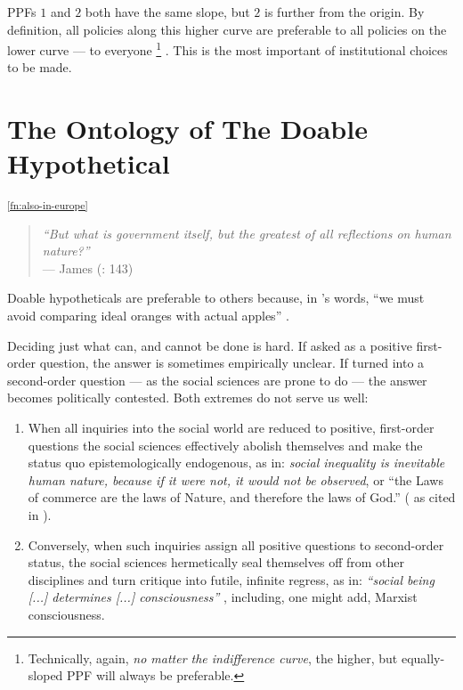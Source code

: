 	\glspl{PPF} $1$ and $2$ both have the same slope, but $2$ is further from the origin.
	By definition, all policies along this higher curve are preferable to all policies on the lower curve --- to everyone
	\footnote{
		Technically, again, \emph{no matter the indifference curve}, the higher, but equally-sloped \gls{PPF} will always be preferable. 
	}
	.
	This is the most important of institutional choices to be made.
	



\section[Ontology]{The Ontology of The Doable Hypothetical} \label{sec:doable} 

\textsuperscript{\ref{fn:also-in-europe}}


\begin{quote}
	\emph{``But what is government itself, but the greatest of all reflections on human nature?''}\\
	--- James \citeauthor{Madison1788} (\citeyear{Madison1788}: 143)
\end{quote}

Doable hypotheticals are preferable to others because, in \citeauthor{Dahl-1989-aa}'s words, ``we must avoid comparing ideal oranges with actual apples'' \citeyearpar[84]{Dahl-1989-aa}. 

Deciding just what can, and cannot be done is hard. 
If asked as a positive first-order question, the answer is sometimes empirically unclear. 
If turned into a second-order question --- as the social sciences are prone to do --- the answer becomes politically contested. 
Both extremes do not serve us well:
\begin{enumerate}
	\item 
		When all inquiries into the social world are reduced to positive, first-order questions the social sciences effectively abolish themselves and make the status quo epistemologically endogenous, as in: \emph{social inequality is inevitable human nature, because if it were not, it would not be observed}, or ``the Laws of commerce are the laws of Nature, and therefore the laws of God.'' (\citeauthor{Burke1790} as cited in \citealt[834]{Marx-1867-aa}).%
	\item 
	Conversely, when such inquiries assign all positive questions to second-order status, the social sciences hermetically seal themselves off from other disciplines and turn critique into futile, infinite regress, as in: \emph{``social being [...] determines [...] consciousness''} \citep[Preface]{Marx1859}, including, one might add, Marxist consciousness. %
\end{enumerate}

